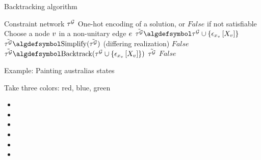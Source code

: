 \documentclass{beamer}
\begin{document}
    \begin{frame}{Backtracking algorithm}

        \begin{algorithm}[H]
\begin{algorithmic}
    \Require Constraint network $\tau^{\mathcal{G}}$
    \Ensure One-hot encoding of a solution, or $False$ if not satisfiable
    \iosepline
    \State Choose a node $v$ in a non-unitary edge $e$
    \For{$\catindexofin{\node}$}
        \State $\tilde{\extnet}\algdefsymbol\extnet\cup\{\onehotmapofat{\catindexof{\node}}{\catvariableof{\node}}\}$
        \State $\tilde{\extnet}\algdefsymbol\mathrm{Simplify}(\tilde{\extnet})$ \hfill \textcolor{\concolor}{(differing realization)}
            \State \Return $False$
        \EndIf
        \State $\tilde{\extnet}\algdefsymbol\mathrm{Backtrack}(\extnet\cup\{\onehotmapofat{\catindexof{\node}}{\catvariableof{\node}}\})$
            \State \Return $\tilde{\tau^{\mathcal{G}}}$
        \EndIf
    \EndFor
    \State \Return $False$
\end{algorithmic}
        \end{algorithm}

    \end{frame}


%
%

    \begin{frame}{Example: Painting australias states}

        Take three colors: red, blue, green

        
        \begin{itemize}
            \item {}
            \item {}
            \item {}
            \item {}
            \item {}
            \item {}
        \end{itemize}


    \end{frame}
\end{document}
